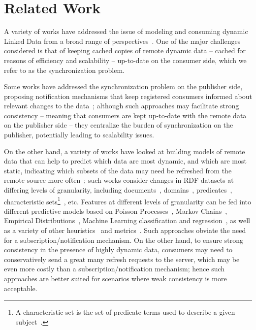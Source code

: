 \documentclass[runningheads]{llncs}
\begin{document}
%
\section{Related Work}
\label{sec:related}
%

A variety of works have addressed the issue of modeling and consuming dynamic Linked Data from a broad range of perspectives~\cite{PassantM10,TrampFEA10,UmbrichHHPD10,UmbrichKL10,KaferAUOH13,DividinoSGG13,DividinoKG14,Kjernsmo15,NishiokaS16,GonzalezH18}. One of the major challenges considered is that of keeping cached copies of remote dynamic data -- cached for reasons of efficiency and scalability -- up-to-date on the consumer side, which we refer to as the synchronization problem.

Some works have addressed the synchronization problem on the publisher side, proposing notification mechanisms that keep registered consumers informed about relevant changes to the data~\cite{MissierACDG07,PassantM10,TrampFEA10,MaderMS14,webSub18}; although such approaches may facilitate strong consistency -- meaning that consumers are kept up-to-date with the remote data on the publisher side -- they centralize the burden  of synchronization on the publisher, potentially leading to scalability issues. 

On the other hand, a variety of works have looked at building models of remote data that can help to predict which data are most dynamic, and which are most static, indicating which subsets of the data may need be refreshed from the remote source more often~\cite{PassantM10,TrampFEA10,UmbrichHHPD10,UmbrichKL10,KaferAUOH13,DividinoSGG13,NishiokaS16,GonzalezH18}; such works consider changes in RDF datasets at differing levels of granularity, including documents~\cite{KaferAUOH13}, domains~\cite{KaferAUOH13,NishiokaS16,NishiokaS17}, predicates~\cite{KaferAUOH13,NishiokaS17}, characteristic sets\footnote{A characteristic set is the set of predicate terms used to describe a given subject~\cite{NeumannM11}.}~\cite{NishiokaS16,GonzalezH18}, etc. Features at different levels of granularity can be fed into different predictive models based on Poisson Processes~\cite{UmbrichHHPD10}, Markov Chains~\cite{UmbrichMP15}, Empirical Distributions~\cite{NeumaierU16}, Machine Learning classification and regression~\cite{NishiokaS17,GonzalezH18}, as well as a variety of other heuristics~\cite{AliciAOCU12,UmbrichMP15,KnuthHS16} and metrics~\cite{DividinoGS15,KnuthHS16,AkhtarAL17}. Such approaches obviate the need for a subscription/notification mechanism. On the other hand, to ensure strong consistency in the presence of highly dynamic data, consumers may need to conservatively send a great many refresh requests to the server, which may be even more costly than a subscription/notification mechanism; hence such approaches are better suited for scenarios where weak consistency is more acceptable.
\end{document}
